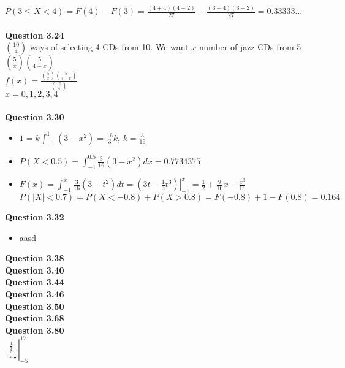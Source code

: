 \documentclass{article}
\begin{document}
    $P(3\leq X<4) = F(4) - F(3) = \frac{(4+4)(4-2)}{27} - \frac{(3+4)(3-2)}{27} = 0.33333...$\\\\
    \textbf{Question 3.24}\\
    $\binom{10}{4}$ ways of selecting 4 CDs from 10. We want $x$ number of jazz CDs from 5 $\binom{5}{x}\binom{5}{4-x}$\\
    $f(x) = \frac{\binom{5}{x}\binom{5}{4-x}}{\binom{10}{4}}$\\
    $x = 0,1,2,3,4$\\\\
    \textbf{Question 3.30}
    \begin{itemize}
        \item $1 = k\int_{-1}^{1}(3-x^2) = \frac{16}{3}k$, $k=\frac{3}{16}$
        \item $P(X<0.5) = \int_{-1}^{0.5}\frac{3}{16}(3-x^2)dx = 0.7734375$
        \item $F(x) = \int_{-1}^{x}\frac{3}{16}(3-t^2)dt = \left.(3t-\frac{1}{3}t^3)\right\vert_{-1}^{x} = \frac{1}{2} + \frac{9}{16}x - \frac{x^3}{16}$\\
              $P(|X|<0.7) = P(X<-0.8) + P(X>0.8) = F(-0.8)+1-F(0.8) = 0.164$
    \end{itemize}
    \textbf{Question 3.32}\\
    \begin{itemize}
        \item aasd
    \end{itemize}
    \textbf{Question 3.38}\\
    \textbf{Question 3.40}\\
    \textbf{Question 3.44}\\
    \textbf{Question 3.46}\\
    \textbf{Question 3.50}\\
    \textbf{Question 3.68}\\
    \textbf{Question 3.80}\\

    $  \left.\frac{\frac{1}{x}}{\frac{5}{1+\frac{x}{7}}}\right\vert_{-5}^{17}$\\
    
\end{document}
